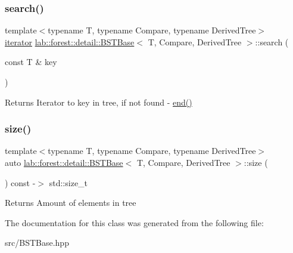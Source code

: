 \subsubsection{\texorpdfstring{search()}{search()}}
{\footnotesize\ttfamily template$<$typename T, typename Compare, typename Derived\+Tree$>$ \\
\hyperlink{classlab_1_1forest_1_1detail_1_1BSTIterator}{iterator} \hyperlink{classlab_1_1forest_1_1detail_1_1BSTBase}{lab\+::forest\+::detail\+::\+B\+S\+T\+Base}$<$ T, Compare, Derived\+Tree $>$\+::search (\begin{DoxyParamCaption}\item[{const T \&}]{key }\end{DoxyParamCaption})\hspace{0.3cm}{\ttfamily [noexcept]}}

\begin{DoxyReturn}{Returns}
Iterator to key in tree, if not found -\/ \hyperlink{classlab_1_1forest_1_1detail_1_1BSTBase_ad2ea364cc61d5581a861d1aab3734129}{end()} 
\end{DoxyReturn}
\mbox{\label{classlab_1_1forest_1_1detail_1_1BSTBase_a26625c36d62d907106f61a33f793777b}} 
\subsubsection{\texorpdfstring{size()}{size()}}
{\footnotesize\ttfamily template$<$typename T, typename Compare, typename Derived\+Tree$>$ \\
auto \hyperlink{classlab_1_1forest_1_1detail_1_1BSTBase}{lab\+::forest\+::detail\+::\+B\+S\+T\+Base}$<$ T, Compare, Derived\+Tree $>$\+::size (\begin{DoxyParamCaption}{ }\end{DoxyParamCaption}) const -\/$>$  std\+::size\+\_\+t\hspace{0.3cm}{\ttfamily [noexcept]}}

\begin{DoxyReturn}{Returns}
Amount of elements in tree 
\end{DoxyReturn}


The documentation for this class was generated from the following file\+:\begin{DoxyCompactItemize}
\item 
src/B\+S\+T\+Base.\+hpp\end{DoxyCompactItemize}
